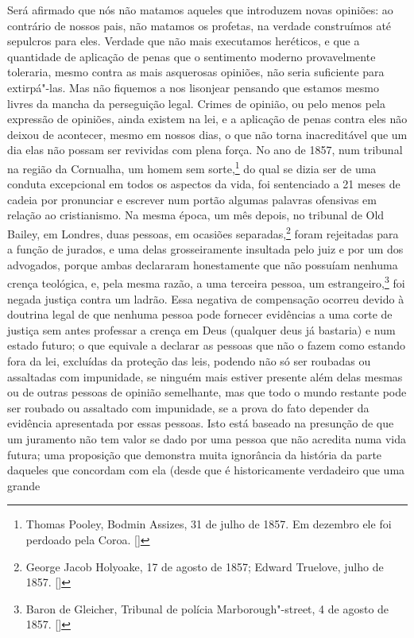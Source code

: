 Será afirmado que nós não matamos aqueles que introduzem novas opiniões:
ao contrário de nossos pais, não matamos os profetas, na verdade
construímos até sepulcros para eles. Verdade que não mais executamos
heréticos, e que a quantidade de aplicação de penas que o sentimento
moderno provavelmente toleraria, mesmo contra as mais asquerosas
opiniões, não seria suficiente para extirpá"-las. Mas não fiquemos
a nos lisonjear pensando que estamos mesmo livres da mancha da
perseguição legal. Crimes de opinião, ou pelo menos pela expressão de
opiniões, ainda existem na lei, e a aplicação de penas contra eles não
deixou de acontecer, mesmo em nossos dias, o que não torna
inacreditável que um dia elas não possam ser revividas com plena força.
No ano de 1857, num tribunal na região da Cornualha, um homem sem 
sorte,\footnote{ Thomas Pooley, Bodmin Assizes, 
31 de julho de 1857. Em dezembro ele foi perdoado pela Coroa. []}
do qual se dizia ser de uma conduta excepcional em todos os aspectos da
vida, foi sentenciado a 21 meses de cadeia por pronunciar e
escrever num portão algumas palavras ofensivas em relação ao
cristianismo. Na mesma época, um mês depois, no tribunal de Old Bailey,
em Londres, duas pessoas, em ocasiões separadas,\footnote{ George Jacob 
Holyoake, 17 de agosto de 1857; Edward Truelove, julho de 1857. []} foram rejeitadas para
a função de jurados, e uma delas grosseiramente insultada pelo juiz e
por um dos advogados, porque ambas declararam honestamente que não
possuíam nenhuma crença teológica, e, pela mesma razão, a uma terceira pessoa, um
estrangeiro,\footnote{ Baron de Gleicher, Tribunal de polícia Marborough"-street, 
4 de agosto de 1857. []} foi negada justiça contra um ladrão.
Essa negativa de compensação ocorreu devido à doutrina legal de que
nenhuma pessoa pode fornecer evidências a uma corte de justiça sem
antes professar a crença em Deus (qualquer deus já bastaria) e num
estado futuro; o que equivale a declarar as pessoas que não o fazem
como estando fora da lei, excluídas da proteção das leis, podendo não
só ser roubadas ou assaltadas com impunidade, se ninguém mais estiver
presente além delas mesmas ou de outras pessoas de opinião semelhante,
mas que todo o mundo restante pode ser roubado ou assaltado com impunidade,
se a prova do fato depender da evidência apresentada por essas pessoas.
Isto está baseado na presunção de que um juramento não tem valor se
dado por uma pessoa que não acredita numa vida futura; uma proposição
que demonstra muita ignorância da história da parte daqueles que
concordam com ela (desde que é historicamente verdadeiro que uma grande
